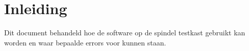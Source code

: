 \section{Inleiding}

Dit document behandeld hoe de software op de spindel testkast gebruikt kan worden en waar bepaalde errors voor kunnen staan.